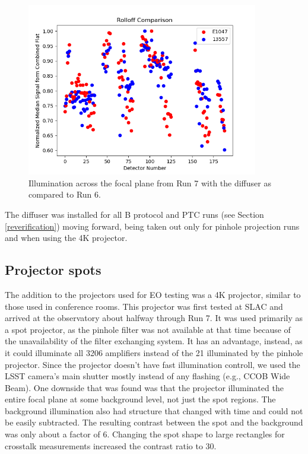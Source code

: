 \begin{figure}[htbp]
\centering
\includegraphics[width=0.9\textwidth]{figures/Run7_DiffuserIllumination.png}
\caption{Illumination across the focal plane from Run 7 with the diffuser as compared to Run 6.}
\label{fig:roll-off}
\end{figure}



The diffuser was installed for all B protocol and PTC runs (see Section \ref{reverification}) moving
forward, being taken out only for pinhole projection runs and when using the
4K projector.

\subsection{Projector spots}\label{projector-spots}
The addition to the projectors used for EO testing was a 4K
projector, similar to those used in conference rooms. This projector was
first tested at SLAC and arrived at the observatory about halfway through Run 7.
It was used primarily as a spot projector, as the pinhole filter
was not available at that time because of the unavailability of the filter exchanging system. It has an advantage, instead, as it could
illuminate all 3206 amplifiers instead of the 21 illuminated by the
pinhole projector. Since the projector doesn't have fast illumination controll, we used the LSST camera's main shutter mostly instead of any flashing (e.g., CCOB Wide Beam). One
downside that was found was that the projector illuminated the entire focal plane at some background level, not just the spot regions. The background illumination also had
structure that changed with time and could not be easily subtracted. The resulting contrast between the spot and the background was only about a factor of 6. Changing the spot shape to large rectangles for crosstalk
measurements increased the contrast ratio to 30.

